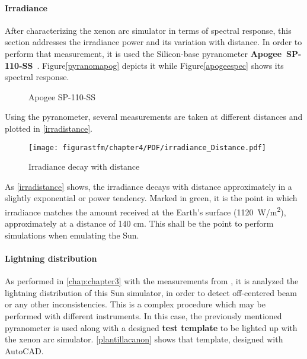 \paragraph{Irradiance}

After characterizing the xenon arc simulator in terms of spectral response, this section addresses the irradiance power and its variation with distance. In order to perform that measurement, it is used the Silicon-base pyranometer \textbf{Apogee~SP-110-SS}~\cite{apogee}. Figure\autoref{pyranomapog} depicts it while Figure\autoref{apogeespec} shows its spectral response.

			\begin{figure}[H]
			\centering
			 \quad
			\caption{Apogee SP-110-SS \cite{apogee}}
			\vspace{-0.75cm}
\end{figure}

 Using the pyranometer, several measurements are taken at different distances and plotted in \autoref{irradistance}.

\begin{figure}[H]
			\centering
			\texttt{[image: figurastfm/chapter4/PDF/irradiance\_Distance.pdf]}
			\caption{Irradiance decay with distance} \label{irradistance}
			\vspace{-2cm}
\end{figure}

As \autoref{irradistance} shows, the irradiance decays with distance approximately in a slightly exponential or power tendency. Marked in green, it is the point in which irradiance matches the amount received at the Earth's surface (\SI{1120}{W/m^2}), approximately at a distance of 140 cm. This shall be the point to perform simulations when emulating the Sun.

\paragraph{Lightning distribution}

As performed in \autoref{chap:chapter3} with the measurements from \cite{catalan}, it is analyzed the lightning distribution of this Sun simulator, in order to detect off-centered beam or any other inconsistencies. This is a complex procedure which may be performed with different instruments. In this case, the previously mentioned pyranometer is used along with a designed \textbf{test template} to be lighted up with the xenon arc simulator. \autoref{plantillacanon} shows that template, designed with AutoCAD.

